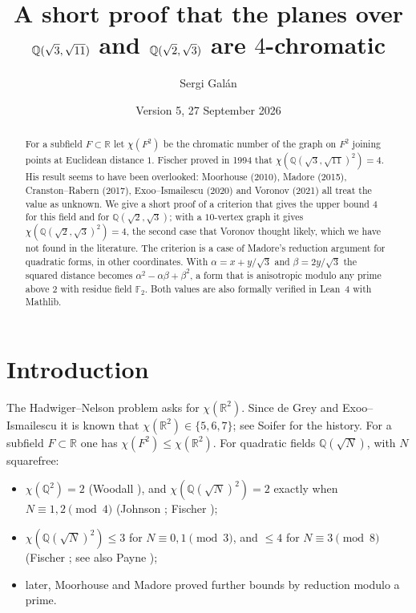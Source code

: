 \documentclass[11pt,a4paper]{amsart}
\title[The planes over $\Q(\sqrt3,\sqrt{11})$ and $\Q(\sqrt2,\sqrt3)$ are $4$-chromatic]{A short proof that the
planes over $\Q(\sqrt3,\sqrt{11})$ and $\Q(\sqrt2,\sqrt3)$ are $4$-chromatic}
\author{Sergi Gal\'an}
\date{Version 5, 27 September 2026}
\theoremstyle{remark}
\newcommand{\F}{\mathbb{F}}
\newcommand{\Q}{\mathbb{Q}}
\newcommand{\R}{\mathbb{R}}
\begin{document}
\begin{abstract}
For a subfield $F\subset\R$ let $\chi(F^2)$ be the chromatic number of the graph on $F^2$ joining points at
Euclidean distance $1$. Fischer proved in 1994 that $\chi(\Q(\sqrt3,\sqrt{11})^2)=4$. His result seems to have
been overlooked: Moorhouse (2010), Madore (2015), Cranston--Rabern (2017), Exoo--Ismailescu (2020) and Voronov
(2021) all treat the value as unknown. We give a short proof of a criterion that gives the upper bound $4$ for
this field and for $\Q(\sqrt2,\sqrt3)$; with a $10$-vertex graph it gives $\chi(\Q(\sqrt2,\sqrt3)^2)=4$, the
second case that Voronov thought likely, which we have not found in the literature. The criterion is a case of
Madore's reduction argument for quadratic forms, in other coordinates. With $\alpha=x+y/\sqrt3$ and
$\beta=2y/\sqrt3$ the squared distance becomes $\alpha^2-\alpha\beta+\beta^2$, a form that is anisotropic modulo
any prime above $2$ with residue field $\F_2$. Both values are also formally verified in Lean~4 with Mathlib.
\end{abstract}

\maketitle

\section{Introduction}

The Hadwiger--Nelson problem asks for $\chi(\R^2)$. Since de Grey \cite{deGrey} and Exoo--Ismailescu
\cite{ExooIsmailescu} it is known that $\chi(\R^2)\in\{5,6,7\}$; see Soifer \cite{Soifer} for the history. For a
subfield $F\subset\R$ one has $\chi(F^2)\le\chi(\R^2)$. For quadratic fields $\Q(\sqrt N)$, with $N$ squarefree:
\begin{itemize}
\item $\chi(\Q^2)=2$ (Woodall \cite{Woodall}), and $\chi(\Q(\sqrt N)^2)=2$ exactly when $N\equiv1,2\pmod 4$
(Johnson \cite{Johnson1987}; Fischer \cite[Thm.~8]{Fischer1990});
\item $\chi(\Q(\sqrt N)^2)\le3$ for $N\equiv0,1\pmod 3$, and $\le4$ for $N\equiv3\pmod 8$ (Fischer
\cite[Thms.~9, 10]{Fischer1990}; see also Payne \cite{Payne});
\item later, Moorhouse \cite{Moorhouse} and Madore \cite{Madore} proved further bounds by reduction modulo a
prime.
\end{itemize}
\end{document}

